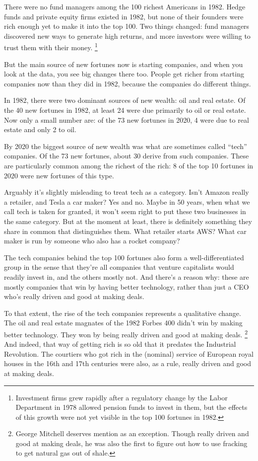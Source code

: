 \documentclass[12pt]{book}
\begin{document}
There were no fund managers among the 100 richest Americans in 1982.
Hedge funds and private equity firms existed in 1982, but none of their
founders were rich enough yet to make it into the top 100. Two things
changed: fund managers discovered new ways to generate high returns, and
more investors were willing to trust them with their money.
\footnote{Investment firms grew rapidly after a regulatory change by the
Labor Department in 1978 allowed pension funds to invest in them, but
the effects of this growth were not yet visible in the top 100 fortunes
in 1982.}

But the main source of new fortunes now is starting companies, and when
you look at the data, you see big changes there too. People get richer
from starting companies now than they did in 1982, because the companies
do different things.

In 1982, there were two dominant sources of new wealth: oil and real
estate. Of the 40 new fortunes in 1982, at least 24 were due primarily
to oil or real estate. Now only a small number are: of the 73 new
fortunes in 2020, 4 were due to real estate and only 2 to oil.

By 2020 the biggest source of new wealth was what are sometimes called
``tech'' companies. Of the 73 new fortunes, about 30 derive from such
companies. These are particularly common among the richest of the rich:
8 of the top 10 fortunes in 2020 were new fortunes of this type.

Arguably it's slightly misleading to treat tech as a category. Isn't
Amazon really a retailer, and Tesla a car maker? Yes and no. Maybe in 50
years, when what we call tech is taken for granted, it won't seem right
to put these two businesses in the same category. But at the moment at
least, there is definitely something they share in common that
distinguishes them. What retailer starts AWS? What car maker is run by
someone who also has a rocket company?

The tech companies behind the top 100 fortunes also form a
well-differentiated group in the sense that they're all companies that
venture capitalists would readily invest in, and the others mostly not.
And there's a reason why: these are mostly companies that win by having
better technology, rather than just a CEO who's really driven and good
at making deals.

To that extent, the rise of the tech companies represents a qualitative
change. The oil and real estate magnates of the 1982 Forbes 400 didn't
win by making better technology. They won by being really driven and
good at making deals. \footnote{George Mitchell deserves mention as an exception. Though really
driven and good at making deals, he was also the first to figure out how
to use fracking to get natural gas out of shale.} And indeed, that way of
getting rich is so old that it predates the Industrial Revolution. The
courtiers who got rich in the (nominal) service of European royal houses
in the 16th and 17th centuries were also, as a rule, really driven and
good at making deals.
\end{document}
